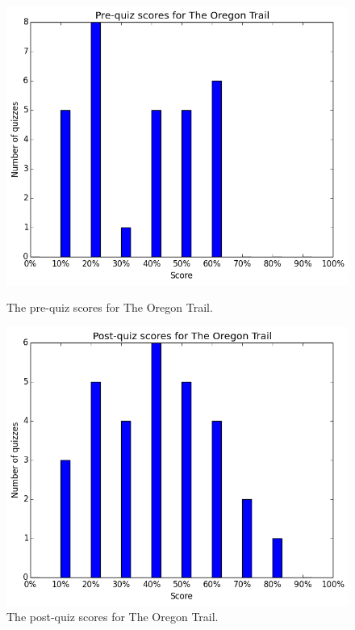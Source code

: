 			\begin{figure}[h] 
			\centering 
			\begin{minipage}[b]{0.45\linewidth}
			\includegraphics[height=0.33\textheight]{oregon_pre.png} 
			\caption{The pre-quiz scores for The Oregon Trail.}
			\end{minipage}
			\quad
			\begin{minipage}[b]{0.45\linewidth}
			\includegraphics[height=0.33\textheight]{oregon_post.png} 
			\caption{The post-quiz scores for The Oregon Trail.}
			\end{minipage}
			\end{figure}
			
